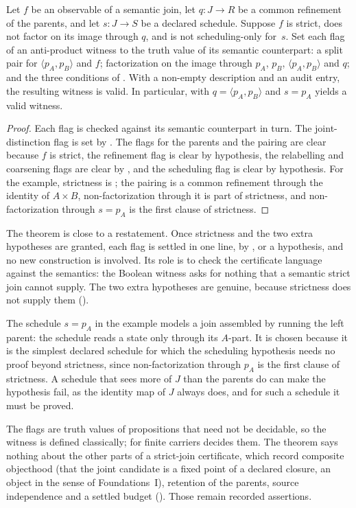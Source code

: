 \begin{theorem}
\label{thm:bridge}
Let $f$ be an observable of a semantic join, let $q:J\to R$ be a common refinement of the
parents, and let $s:J\to S$ be a declared schedule. Suppose $f$ is strict, does not factor
on its image through $q$, and is not scheduling-only for~$s$. Set each flag of an
anti-product witness to the truth value of its semantic counterpart: a split pair for
$\langle p_A,p_B\rangle$ and $f$; factorization on the image through $p_A$, $p_B$,
$\langle p_A,p_B\rangle$ and $q$; and the three conditions of . With a
non-empty description and an audit entry, the resulting witness is valid. In particular,
 with $q=\langle p_A,p_B\rangle$ and $s=p_A$ yields a valid witness.
\end{theorem}

\begin{proof}
Each flag is checked against its semantic counterpart in turn.
The joint-distinction flag is set by . The flags for the parents and
the pairing are clear because $f$ is strict, the refinement flag is clear by hypothesis,
the relabelling and coarsening flags are clear by , and the
scheduling flag is clear by hypothesis. For the example, strictness is
; the pairing is a common refinement through the identity of $A\times B$,
non-factorization through it is part of strictness, and non-factorization through $s=p_A$
is the first clause of strictness.
\end{proof}

The theorem is close to a restatement. Once strictness and the two extra hypotheses are
granted, each flag is settled in one line, by ,
 or a hypothesis, and no new construction is involved. Its
role is to check the certificate language against the semantics: the Boolean witness asks
for nothing that a semantic strict join cannot supply.
The two extra hypotheses are genuine, because strictness does not supply them
().

The schedule $s=p_A$ in the example models a join assembled by running the left parent:
the schedule reads a state only through its $A$-part. It is chosen because it is the
simplest declared schedule for which the scheduling hypothesis needs no proof beyond
strictness, since non-factorization through $p_A$ is the first clause of strictness. A
schedule that sees more of $J$ than the parents do can make the hypothesis fail, as the
identity map of $J$ always does, and for such a schedule it must be proved.

The flags are truth values of propositions that need not be decidable, so the witness is
defined classically; for finite carriers  decides them. The
theorem says nothing about the other parts of a strict-join certificate, which record
composite objecthood (that the joint candidate is a fixed point of a declared closure, an
object in the sense of Foundations~I), retention of the parents, source independence and a settled budget
(). Those remain recorded assertions.
